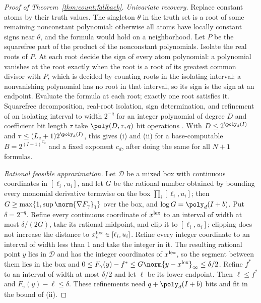 \begin{proof}[Proof of Theorem~\ref{thm:count:fallback}]
\emph{Univariate recovery.} Replace constant atoms by their truth values. The
singleton $\theta$ in the truth set is a root of some remaining nonconstant
polynomial: otherwise all atoms have locally constant signs near $\theta$, and
the formula would hold on a neighborhood. Let $P$ be the squarefree part of
the product of the nonconstant polynomials. Isolate the real roots of $P$.
At each root decide the sign of every atom polynomial: a polynomial vanishes
at the root exactly when the root is a root of its greatest common divisor
with $P$, which is decided by counting roots in the isolating interval; a
nonvanishing polynomial has no root in that interval, so its sign is the sign
at an endpoint. Evaluate the formula at each root; exactly one root satisfies
it. Squarefree decomposition, real-root isolation, sign determination, and
refinement of an isolating interval to width $2^{-q}$ for an integer
polynomial of degree $D$ and coefficient bit length $\tau$ take
$\poly(D,\tau,q)$ bit operations
\cite{basu2006-algorithms-in-real-algebraic-geometry,mehlhorn2015-from-approximate-factorization-to-root}.
With $D\le2^{\poly_d(I)}$ and $\tau\le(L_{\rm c}+1)2^{\poly_d(I)}$, this gives
(i) and (ii) for a base-computable $B=2^{(I+1)^{C_d}}$ and a fixed exponent
$c_d$, after doing the same for all $N+1$ formulas.

\emph{Rational feasible approximation.} Let $\mathcal D$ be a mixed box with
continuous coordinates in $[\ell_i,u_i]$, and let $G$ be the rational number
obtained by bounding every monomial derivative termwise on the box
$\prod_i[\ell_i,u_i]$; then $G\ge\max\{1,\sup\norm{\nabla F_\gamma}_1\}$ over the
box, and $\log G=\poly_d(I+b)$. Put $\delta=2^{-q}$. Refine every continuous
coordinate of $x^{\rm lex}$ to an interval of width at most $\delta/(2G)$,
take its rational midpoint, and clip it to $[\ell_i,u_i]$; clipping does not
increase the distance to $x_i^{\rm lex}\in[\ell_i,u_i]$. Refine every integer
coordinate to an interval of width less than $1$ and take the integer in it.
The resulting rational point $y$ lies in $\mathcal D$ and has the integer
coordinates of $x^{\rm lex}$, so the segment between them lies in the box and
$0\le F_\gamma(y)-f^*\le G\norm{y-x^{\rm lex}}_\infty\le\delta/2$. Refine
$f^*$ to an interval of width at most $\delta/2$ and let $\ell$ be its lower
endpoint. Then $\ell\le f^*$ and $F_\gamma(y)-\ell\le\delta$. These refinements
need $q+\poly_d(I+b)$ bits and fit in the bound of (ii).
\end{proof}
